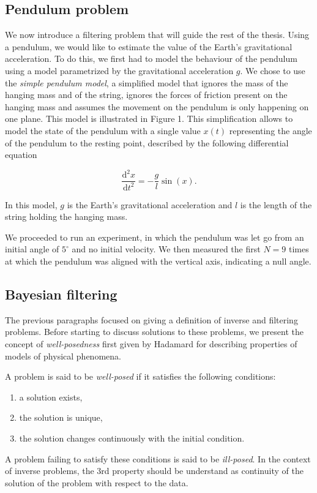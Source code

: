 \subsection{Pendulum problem}

We now introduce a filtering problem that will guide the rest of the thesis. Using a pendulum, we would like to estimate the value of the Earth's gravitational acceleration. To do this, we first had to model the behaviour of the pendulum using a model parametrized by the gravitational acceleration $g$. We chose to use the \textit{simple pendulum model}, a simplified model that ignores the mass of the hanging mass and of the string, ignores the forces of friction present on the hanging mass and assumes the movement on the pendulum is only happening on one plane. This model is illustrated in Figure 1. This simplification allows to model the state of the pendulum with a single value $x(t)$ representing the angle of the pendulum to the resting point, described by the following differential equation

\begin{equation}\label{pendulum-ode}
  \frac{\text{d}^2x}{\text{d}t^2} = -\frac{g}{l}\sin(x).
\end{equation}

In this model, $g$ is the Earth's gravitational acceleration and $l$ is the length of the string holding the hanging mass.

We proceeded to run an experiment, in which the pendulum was let go from an initial angle of $5^\circ$ and no initial velocity. We then measured the first $N = 9$ times at which the pendulum was aligned with the vertical axis, indicating a null angle.

\subsection{Bayesian filtering}

The previous paragraphs focused on giving a definition of inverse and filtering problems. Before starting to discuss solutions to these problems, we present the concept of \textit{well-posedness} first given by Hadamard for describing properties of models of physical phenomena.

\begin{definition} A problem is said to be \textit{well-posed} if it satisfies the following conditions:
  \begin{enumerate}
  \item{a solution exists,}
  \item{the solution is unique,}
  \item{the solution changes continuously with the initial condition.}
  \end{enumerate}

  A problem failing to satisfy these conditions is said to be \textit{ill-posed}. In the context of inverse problems, the 3rd property should be understand as continuity of the solution of the problem with respect to the data.  
\end{definition}

